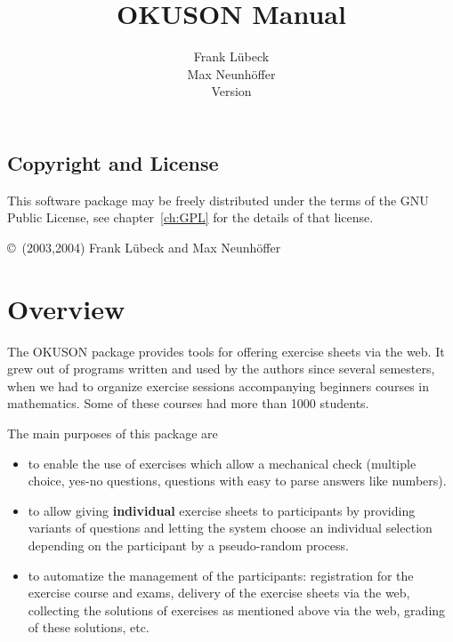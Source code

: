 \documentclass[12pt,openany,a4paper]{book}
\newcommand{\OKUSON}{\textsf{OKUSON}}
\begin{document}
\title{\Huge \textbf {\OKUSON} Manual}
\author{Frank Lübeck\\Max Neunhöffer \\[2cm] Version }
\maketitle
\tableofcontents

\chapter*{}
\section*{Copyright and License}

This software package may be freely distributed under the terms of the
GNU Public License, see chapter~\ref{ch:GPL} for the details of that
license.

\copyright\  (2003,2004) Frank Lübeck and Max Neunhöffer


\chapter{Overview}

The {\OKUSON} package provides tools for offering exercise sheets via the
web. It grew out of programs written and used by the authors since several
semesters, when we had to organize exercise sessions accompanying beginners
courses in mathematics. Some of these courses had more than 1000 students.

The main purposes of this package are
\begin{itemize}
\item to enable the use of exercises which allow a mechanical check (multiple 
choice, yes-no questions, questions with easy to parse answers like numbers).
\item to allow giving \textbf{individual} exercise sheets to participants
by providing variants of questions and letting the system choose an
individual selection depending on the participant by a pseudo-random
process.
\item to automatize the management of the participants: registration for the
exercise course and exams, delivery of the exercise sheets via the web, 
collecting the  solutions of exercises as mentioned above via the web,
grading of these solutions, etc.
\end{itemize}
\end{document}
